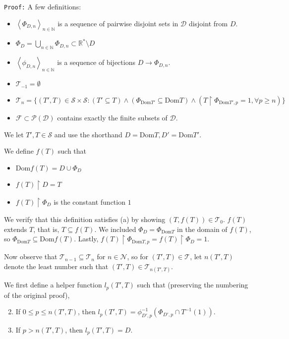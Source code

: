 \documentclass[12pt]{article}
\theoremstyle{plain}
\theoremstyle{definition}
\theoremstyle{remark}
\begin{document}
\texttt{Proof:} A few definitions:

	\begin{itemize}
	\item $\left<\Phi_{D,n}\right>_{n\in\mathbb{N}}$ is a sequence of pairwise disjoint sets in $\mathcal{D}$ disjoint from $D$.
	\item $\Phi_D = \bigcup_{n\in\mathbb{N}} \Phi_{D,n} \subset \mathbb{R}^*\setminus D$
	\item $\left<\phi_{D,n}\right>_{n\in\mathbb{N}}$ is a sequence of bijections $D\to\Phi_{D,n}$.
	\item $\mathcal{T}_{-1}=\emptyset$
	\item $\mathcal{T}_n = \{(T',T)\in \mathcal{S}\times\mathcal{S}: (T' \subseteq T) \wedge (\Phi_{\textrm{Dom}T'}\subseteq \textrm{Dom}T)\wedge(T\restriction \Phi_{\textrm{Dom}T',p} = 1, \forall p \geq n)\}$
	\item $\mathcal{F} \subset \mathcal{P}(\mathcal{D})$ contains exactly the finite subsets of $\mathcal{D}$.
	\end{itemize}
	
We let $T',T\in \mathcal{S}$ and use the shorthand $D=\textrm{Dom}T,D'=\textrm{Dom}T'$.

We define $f(T)$ such that 
	\begin{itemize}
	\item $\textrm{Dom}f(T)=D\cup\Phi_D$
	\item $f(T)\restriction D = T$
	\item $f(T)\restriction \Phi_D$ is the constant function $1$
	\end{itemize}

We verify that this definition satisfies (a) by showing $(T,f(T))\in \mathcal{T}_0$.  $f(T)$ extends $T$, that is, $T \subseteq f(T)$. We included $\Phi_D = \Phi_{\textrm{Dom}T}$ in the domain of $f(T)$, so $\Phi_{\textrm{Dom}T} \subseteq \textrm{Dom}f(T)$. Lastly, $f(T)\restriction \Phi_{\textrm{Dom}T,p} = f(T)\restriction \Phi_{D} = 1$.

Now observe that $\mathcal{T}_{n-1} \subseteq \mathcal{T}_n$ for $n\in \mathcal{N}$, so for $(T',T)\in\mathcal{T}$, let $n(T',T)$ denote the least number such that $(T',T)\in\mathcal{T}_{n(T',T)}$.

We first define a helper function $l_p(T',T)$ such that (preserving the numbering of the original proof),

\begin{enumerate}
\setcounter{enumi}{1}
\item If $0\leq p \leq n(T',T)$, then $l_p(T',T) = \phi^{-1}_{D',p}(\Phi_{D',p}\cap T^{-1}(1))$.
\item If $p > n(T',T)$, then $l_p(T',T) = D$.
\end{enumerate}
\end{document}
